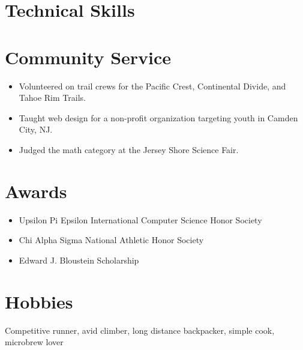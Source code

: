 \documentclass[10.5pt,a4paper,sans]{moderncv}        %
\begin{document}
\section{Technical Skills}

\section{Community Service}
\begin{itemize}
  \item Volunteered on trail crews for the Pacific Crest, Continental Divide, and Tahoe Rim Trails.
  \item Taught web design for a non-profit organization targeting youth in Camden City, NJ.
  \item Judged the math category at the Jersey Shore Science Fair.
\end{itemize}

\section{Awards}
\begin{itemize}
\item Upsilon Pi Epsilon International Computer Science Honor Society
\item Chi Alpha Sigma National Athletic Honor Society
\item Edward J. Bloustein Scholarship
\end{itemize}

\section{Hobbies}
Competitive runner, avid climber, long distance backpacker, simple cook, microbrew lover


\clearpage
\end{document}
